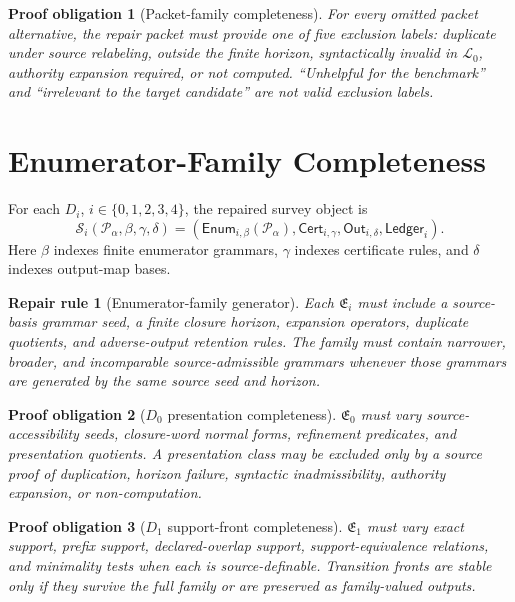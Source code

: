 \documentclass[11pt]{article}
\newcommand{\Lang}{\mathcal{L}_{0}}
\newcommand{\Pack}{\mathcal{P}}
\newcommand{\Enum}{\mathsf{Enum}}
\newcommand{\EnumFam}{\mathfrak{E}}
\newcommand{\Cert}{\mathsf{Cert}}
\newcommand{\Out}{\mathsf{Out}}
\newcommand{\Ledger}{\mathsf{Ledger}}
\newtheorem{repairrule}{Repair rule}
\newtheorem{obligation}{Proof obligation}
\begin{document}
\begin{obligation}[Packet-family completeness]
For every omitted packet alternative, the repair packet must provide one of
five exclusion labels: duplicate under source relabeling, outside the finite
horizon, syntactically invalid in \(\Lang\), authority expansion required, or
not computed. ``Unhelpful for the benchmark'' and ``irrelevant to the target
candidate'' are not valid exclusion labels.
\end{obligation}

\section{Enumerator-Family Completeness}

For each \(D_i\), \(i\in\{0,1,2,3,4\}\), the repaired survey object is
\[
\mathcal{S}_i(\Pack_\alpha,\beta,\gamma,\delta)=
(\Enum_{i,\beta}(\Pack_\alpha),\Cert_{i,\gamma},
\Out_{i,\delta},\Ledger_i).
\]
Here \(\beta\) indexes finite enumerator grammars, \(\gamma\) indexes
certificate rules, and \(\delta\) indexes output-map bases.

\begin{repairrule}[Enumerator-family generator]
Each \(\EnumFam_i\) must include a source-basis grammar seed, a finite
closure horizon, expansion operators, duplicate quotients, and adverse-output
retention rules. The family must contain narrower, broader, and incomparable
source-admissible grammars whenever those grammars are generated by the same
source seed and horizon.
\end{repairrule}

\begin{obligation}[\(D_0\) presentation completeness]
\(\EnumFam_0\) must vary source-accessibility seeds, closure-word normal
forms, refinement predicates, and presentation quotients. A presentation
class may be excluded only by a source proof of duplication, horizon failure,
syntactic inadmissibility, authority expansion, or non-computation.
\end{obligation}

\begin{obligation}[\(D_1\) support-front completeness]
\(\EnumFam_1\) must vary exact support, prefix support, declared-overlap
support, support-equivalence relations, and minimality tests when each is
source-definable. Transition fronts are stable only if they survive the full
family or are preserved as family-valued outputs.
\end{obligation}
\end{document}
